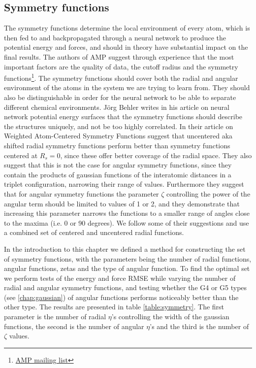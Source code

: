 \subsection{Symmetry functions}\label{chap:symmetry-functions}
The symmetry functions determine the local environment of every atom,
which is then fed to and backpropagated through a neural network
to produce the potential energy and forces,
and should in theory have substantial impact on the final results.
The authors of AMP suggest through experience that the most important
factors are the quality of data, the cutoff radius and the symmetry functions\footnote{
    \href{https://listserv.brown.edu/cgi-bin/wa?A2=AMP-USERS;52062bd3.1810}{
        AMP mailing list}}.
The symmetry functions should cover both the radial and angular
environment of the atoms in the system we are trying to learn from.
They should also be distinguishable in order for the neural network
to be able to separate different chemical environments.
J{\"o}rg Behler writes in his article on neural network potential
energy surfaces \parencite[Behler]{behler2011neural}
that the symmetry functions should describe the structures uniquely,
and not be too highly correlated.
In their article on Weighted Atom-Centered Symmetry Functions
\parencite[Gastegger et al.]{gastegger2018wacsf} suggest that uncentered
aka shifted radial symmetry functions perform better than symmetry functions
centered at $R_s = 0$, since these offer better coverage of the radial space.
They also suggest that this is not the case for angular symmetry functions,
since they contain the products of gaussian functions of the interatomic
distances in a triplet configuration, narrowing their range of values.
Furthermore they suggest that for angular symmetry functions
the parameter $\zeta$ controlling the power of the angular term
should be limited to values of 1 or 2,
and they demonstrate that increasing this parameter narrows
the functions to a smaller range of angles close to the maxima
(i.e. 0 or 90 degrees).
We follow some of their suggestions and use a combined set of
centered and uncentered radial functions. 
\par
In the introduction to this chapter we defined a method
for constructing the set of symmetry functions, with the parameters
being the number of radial functions, angular functions, zetas
and the type of angular function.
To find the optimal set
we perform tests of the energy and force RMSE while varying the
number of radial and angular symmetry functions, and testing
whether the G4 or G5 types (see \ref{chap:gaussian})
of angular functions performs noticeably
better than the other type.
The results are presented in table \ref{table:symmetry}.
The first parameter is the number of radial $\eta$'s
controlling the width of the gaussian functions,
the second is the number of angular $\eta$'s and the third
is the number of $\zeta$ values.

